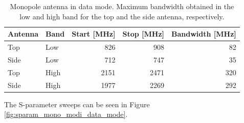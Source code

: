 \begin{table}[htbp]
  \centering
  \begin{tabular}{|l|l|r|r|r|}
    \hline
    Antenna & Band & Start [MHz] & Stop [MHz] & Bandwidth [MHz] \\
    \hline
    Top     & Low  &  826  & 908  & 82 \\
    Side    & Low  &  712  & 747  & 35  \\
    \hline
    Top     & High &  2151 &  2471  & 320 \\
    Side    & High & 1977 &  2269 & 292 \\
    \hline
  \end{tabular}
  \caption{Monopole antenna in data mode. Maximum bandwidth obtained in the low and high band for the top and the side antenna, respectively.}    
  \label{tab:bw_mono_modi_dm}
\end{table}
The S-parameter sweeps can be seen in Figure \ref{fig:sparam_mono_modi_data_mode}.

